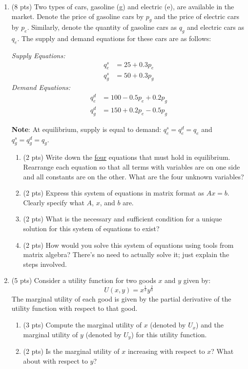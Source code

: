 \documentclass{./../../Latex/tests}
\begin{document}
\begin{enumerate}
\begin{enumerate}
\end{enumerate}

\newpage
\item (8 pts) Two types of cars, gasoline (g) and electric (e), are available in the market. Denote the price of gasoline cars by \(p_g\) and the price of electric cars by \(p_e\). Similarly, denote the quantity of gasoline cars as \(q_g\) and electric cars as \(q_e\). The supply and demand equations for these cars are as follows:

\textit{Supply Equations:}
\begin{align*}
q^s_e &= 25 + 0.3p_e \\
q^s_g &= 50 + 0.3p_g
\end{align*}
\textit{Demand Equations:}
\begin{align*}
q^d_e &= 100 - 0.5p_e + 0.2p_g \\
q^d_g &= 150 + 0.2p_e - 0.5p_g
\end{align*}

\textbf{Note}: At equilibrium, supply is equal to demand: \(q^s_e = q^d_e = q_e\) and \(q^s_g = q^d_g = q_g\).

\begin{enumerate}
\item (2 pts) Write down the \underline{four} equations that must hold in equilibrium. Rearrange each equation so that all terms with variables are on one side and all constants are on the other. What are the four unknown variables?

\newpage
\item (2 pts) Express this system of equations in matrix format as \(Ax = b\). Clearly specify what \(A\), \(x\), and \(b\) are.
\vspace{10cm}
\item (2 pts) What is the necessary and sufficient condition for a unique solution for this system of equations to exist?
\vspace{3cm}
\item (2 pts) How would you solve this system of equations using tools from matrix algebra? There's no need to actually solve it; just explain the steps involved.
\end{enumerate}


\newpage
\item (5 pts) Consider a utility function for two goods \( x \) and \( y \) given by:
\[
U(x, y) = x^{\frac{1}{3}}y^{\frac{2}{3}}
\]
The marginal utility of each good is given by the partial derivative of the utility function with respect to that good.
\begin{enumerate}
  \item (3 pts) Compute the marginal utility of \( x \) (denoted by \( U_x \)) and the marginal utility of \( y \) (denoted by \( U_y \)) for this utility function.
  \vspace{7cm}
  \item (2 pts) Is the marginal utility of \( x \) increasing with respect to \( x \)? What about with respect to \( y \)?
\end{enumerate}


\end{enumerate}
\end{document}

